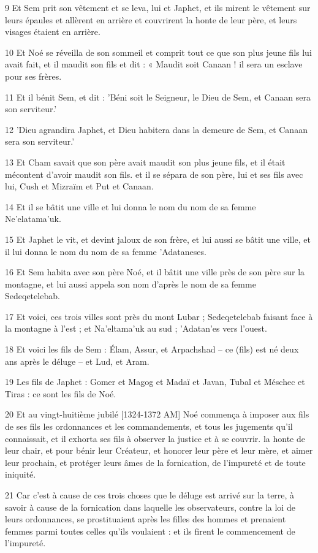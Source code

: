 \par 9 Et Sem prit son vêtement et se leva, lui et Japhet, et ils mirent le vêtement sur leurs épaules et allèrent en arrière et couvrirent la honte de leur père, et leurs visages étaient en arrière.
\par 10 Et Noé se réveilla de son sommeil et comprit tout ce que son plus jeune fils lui avait fait, et il maudit son fils et dit : « Maudit soit Canaan ! il sera un esclave pour ses frères.
\par 11 Et il bénit Sem, et dit : 'Béni soit le Seigneur, le Dieu de Sem, et Canaan sera son serviteur.'
\par 12 'Dieu agrandira Japhet, et Dieu habitera dans la demeure de Sem, et Canaan sera son serviteur.'
\par 13 Et Cham savait que son père avait maudit son plus jeune fils, et il était mécontent d'avoir maudit son fils. et il se sépara de son père, lui et ses fils avec lui, Cush et Mizraïm et Put et Canaan.
\par 14 Et il se bâtit une ville et lui donna le nom du nom de sa femme Ne'elatama'uk.
\par 15 Et Japhet le vit, et devint jaloux de son frère, et lui aussi se bâtit une ville, et il lui donna le nom du nom de sa femme 'Adataneses.
\par 16 Et Sem habita avec son père Noé, et il bâtit une ville près de son père sur la montagne, et lui aussi appela son nom d'après le nom de sa femme Sedeqetelebab.
\par 17 Et voici, ces trois villes sont près du mont Lubar ; Sedeqetelebab faisant face à la montagne à l'est ; et Na'eltama'uk au sud ; 'Adatan'es vers l'ouest.
\par 18 Et voici les fils de Sem : Élam, Assur, et Arpachshad – ce (fils) est né deux ans après le déluge – et Lud, et Aram.
\par 19 Les fils de Japhet : Gomer et Magog et Madaï et Javan, Tubal et Méschec et Tiras : ce sont les fils de Noé.
\par 20 Et au vingt-huitième jubilé [1324-1372 AM] Noé commença à imposer aux fils de ses fils les ordonnances et les commandements, et tous les jugements qu'il connaissait, et il exhorta ses fils à observer la justice et à se couvrir. la honte de leur chair, et pour bénir leur Créateur, et honorer leur père et leur mère, et aimer leur prochain, et protéger leurs âmes de la fornication, de l'impureté et de toute iniquité.
\par 21 Car c'est à cause de ces trois choses que le déluge est arrivé sur la terre, à savoir à cause de la fornication dans laquelle les observateurs, contre la loi de leurs ordonnances, se prostituaient après les filles des hommes et prenaient femmes parmi toutes celles qu'ils voulaient : et ils firent le commencement de l'impureté.
